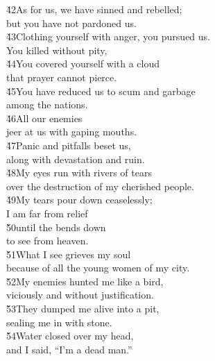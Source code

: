 \begin{poetry}
\poeml \v{42}As for us, we have sinned and rebelled; \\
\poemll    but you have not pardoned us. \\
\poeml \v{43}Clothing yourself with anger, you pursued us. \\
\poemll    You killed without pity, \\
\poeml \v{44}You covered yourself with a cloud \\
\poemll    that prayer cannot pierce. \\
\poeml \v{45}You have reduced us to scum and garbage \\
\poemll    among the nations. \\
\poeml \v{46}All our enemies \\
\poemll    jeer at us with gaping mouths. \\
\poeml \v{47}Panic and pitfalls beset us, \\
\poemll    along with devastation and ruin. \\
\poeml \v{48}My eyes run with rivers of tears \\
\poemll    over the destruction of my cherished people. \\
\poeml \v{49}My tears pour down ceaselessly; \\
\poemll    I am far from relief \\
\poeml \v{50}until the  bends down \\
\poemll    to see from heaven. \\
\poeml \v{51}What I see grieves my soul \\
\poemll    because of all the young women of my city. \\
\poeml \v{52}My enemies hunted me like a bird, \\
\poemll    viciously and without justification. \\
\poeml \v{53}They dumped me alive into a pit, \\
\poemll    sealing me in with stone. \\
\poeml \v{54}Water closed over my head, \\
\poemll    and I said, ``I'm a dead man.'' \\

\end{poetry}

